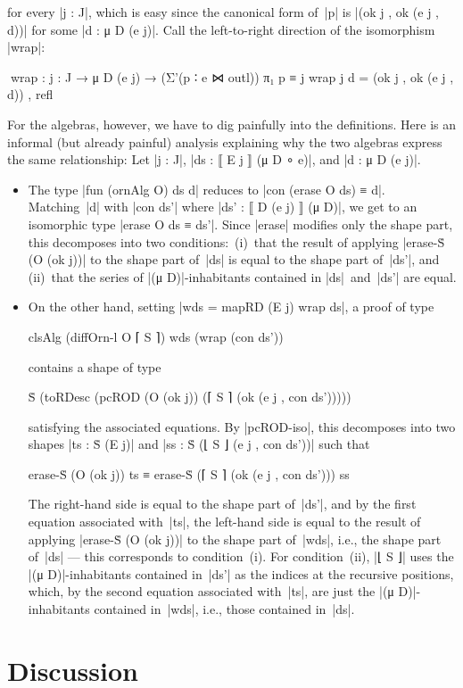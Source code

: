 for every |j : J|, which is easy since the canonical form of~|p| is |(ok j , ok (e j , d))| for some |d : μ D (e j)|.
Call the left-to-right direction of the isomorphism |wrap|:
\begin{code}
^^^wrap : {j : J} → μ D (e j) → (Σ'(p ∶ e ⋈ outl)) π₁ p ≡ j
wrap {j} d = (ok j , ok (e j , d)) , refl
\end{code}
For the algebras, however, we have to dig painfully into the definitions.
Here is an informal (but already painful) analysis explaining why the two algebras express the same relationship:
Let |j : J|, |ds : ⟦ E j ⟧ (μ D ∘ e)|, and |d : μ D (e j)|.
\begin{itemize}
\item The type |fun (ornAlg O) ds d| reduces to |con (erase O ds) ≡ d|.
Matching~|d| with |con ds'| where |ds' : ⟦ D (e j) ⟧ (μ D)|, we get to an isomorphic type |erase O ds ≡ ds'|.
Since |erase| modifies only the shape part, this decomposes into two conditions: \,(i)~that the result of applying |erase-Ṡ (O (ok j))| to the shape part of~|ds| is equal to the shape part of~|ds'|, and \,(ii)~that the series of |(μ D)|-inhabitants contained in |ds|~and~|ds'| are equal.
\item On the other hand, setting |wds = mapRD (E j) wrap ds|, a proof of type
\begin{code}
clsAlg (diffOrn-l O ⌈ S ⌉) wds (wrap (con ds'))
\end{code}
contains a shape of type
\begin{code}
Ṡ (toRDesc (pcROD (O (ok j)) (⌈ S ⌉ (ok (e j , con ds')))))
\end{code}
satisfying the associated equations.
By |pcROD-iso|, this decomposes into two shapes |ts : Ṡ (E j)| and |ss : Ṡ (⌊ S ⌋ (e j , con ds'))| such that
\begin{code}
erase-Ṡ (O (ok j)) ts ≡ erase-Ṡ (⌈ S ⌉ (ok (e j , con ds'))) ss
\end{code}
The right-hand side is equal to the shape part of~|ds'|, and by the first equation associated with~|ts|, the left-hand side is equal to the result of applying |erase-Ṡ (O (ok j))| to the shape part of~|wds|, i.e., the shape part of~|ds| --- this corresponds to condition~(i).
For condition~(ii), |⌊ S ⌋| uses the |(μ D)|-inhabitants contained in~|ds'| as the indices at the recursive positions, which, by the second equation associated with~|ts|, are just the |(μ D)|-inhabitants contained in~|wds|, i.e., those contained in~|ds|.
\end{itemize}


\section{Discussion}
\label{sec:equivalence-discussion}

